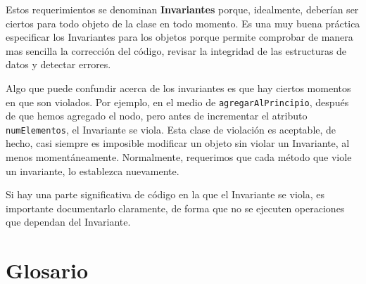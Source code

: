 Estos requerimientos se denominan \textbf{Invariantes} porque, idealmente,
deberían ser ciertos para todo objeto de la clase en todo momento.
Es una muy buena práctica especificar los Invariantes para los objetos
porque permite comprobar de manera mas sencilla la corrección del
código, revisar la integridad de las estructuras de datos y detectar
errores.

Algo que puede confundir acerca de los invariantes es que hay ciertos
momentos en que son violados. Por ejemplo, en el medio de \texttt{agregarAlPrincipio},
después de que hemos agregado el nodo, pero antes de incrementar el
atributo \texttt{numElementos}, el Invariante se viola. Esta clase
de violación es aceptable, de hecho, casi siempre es imposible modificar
un objeto sin violar un Invariante, al menos momentáneamente. Normalmente,
requerimos que cada método que viole un invariante, lo establezca
nuevamente.

Si hay una parte significativa de código en la que el Invariante se
viola, es importante documentarlo claramente, de forma que no se ejecuten
operaciones que dependan del Invariante.


\section{Glosario}

